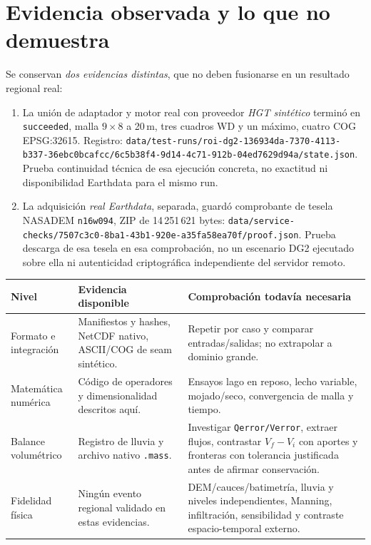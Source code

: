 \documentclass[11pt,a4paper]{article}
\newcommand{\src}[1]{\nolinkurl{#1}}
\begin{document}
\section{Evidencia observada y lo que no demuestra}
\label{sec:evidencia}
Se conservan \emph{dos evidencias distintas}, que no deben fusionarse en un resultado regional real:
\begin{enumerate}
\item La unión de adaptador y motor real con proveedor \emph{HGT sintético} terminó en \texttt{succeeded}, malla $9\times8$ a 20\,m, tres cuadros WD y un máximo, cuatro COG EPSG:32615. Registro: \src{data/test-runs/roi-dg2-136934da-7370-4113-b337-36ebc0bcafcc/6c5b38f4-9d14-4c71-912b-04ed7629d94a/state.json}. Prueba continuidad técnica de esa ejecución concreta, no exactitud ni disponibilidad Earthdata para el mismo run.
\item La adquisición \emph{real Earthdata}, separada, guardó comprobante de tesela NASADEM \texttt{n16w094}, ZIP de 14\,251\,621 bytes: \src{data/service-checks/7507c3c0-8ba1-43b1-920e-a35fa58ea70f/proof.json}. Prueba descarga de esa tesela en esa comprobación, no un escenario DG2 ejecutado sobre ella ni autenticidad criptográfica independiente del servidor remoto.
\end{enumerate}
\begin{tabularx}{\linewidth}{p{.23\linewidth}p{.37\linewidth}X}
\toprule Nivel & Evidencia disponible & Comprobación todavía necesaria\\\midrule
Formato e integración & Manifiestos y hashes, NetCDF nativo, ASCII/COG de seam sintético. & Repetir por caso y comparar entradas/salidas; no extrapolar a dominio grande.\\
Matemática numérica & Código de operadores y dimensionalidad descritos aquí. & Ensayos lago en reposo, lecho variable, mojado/seco, convergencia de malla y tiempo.\\
Balance volumétrico & Registro de lluvia y archivo nativo \texttt{.mass}. & Investigar \texttt{Qerror/Verror}, extraer flujos, contrastar $V_f-V_i$ con aportes y fronteras con tolerancia justificada antes de afirmar conservación.\\
Fidelidad física & Ningún evento regional validado en estas evidencias. & DEM/cauces/batimetría, lluvia y niveles independientes, Manning, infiltración, sensibilidad y contraste espacio-temporal externo.\\\bottomrule
\end{tabularx}
\end{document}
